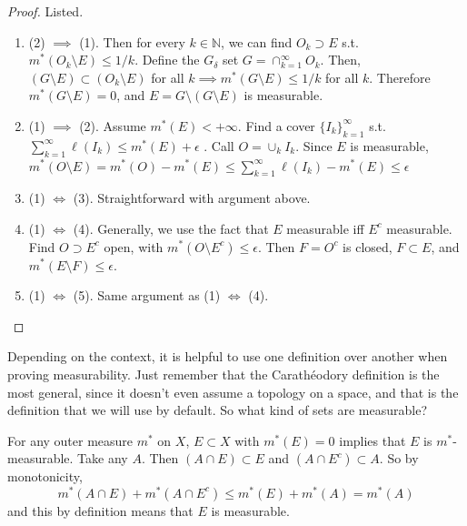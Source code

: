   \begin{proof}
    Listed. 
    \begin{enumerate}
      \item (2) $\implies$ (1). Then for every $k \in \mathbb{N}$, we can find $O_k \supset E$ s.t. $m^\ast (O_k \setminus E) \leq 1/k$. Define the $G_\delta$ set $G = \cap_{k=1}^\infty O_k$. Then, $(G \setminus E) \subset (O_k \setminus E)$ for all $k \implies m^\ast (G \setminus E) \leq 1/k$ for all $k$. Therefore $m^\ast (G \setminus E) = 0$, and $E = G \setminus (G \setminus E)$ is measurable. 

      \item (1) $\implies$ (2). Assume $m^\ast (E) < +\infty$. Find a cover $\{I_k \}_{k=1}^\infty$ s.t. $\sum_{k=1}^\infty \ell (I_k) \leq m^\ast (E) + \epsilon$ . Call $O = \cup_k I_k$. Since $E$ is measurable, $m^\ast (O \setminus E) = m^\ast (O) - m^\ast (E) \leq \sum_{k=1}^\infty \ell(I_k) - m^\ast (E) \leq \epsilon$ 

      \item (1) $\iff$ (3). Straightforward with argument above.  

      \item (1) $\iff$ (4). Generally, we use the fact that $E$ measurable iff $E^c$ measurable. Find $O \supset E^c$ open, with $m^\ast (O \setminus E^c) \leq \epsilon$. Then $F = O^c$ is closed, $F \subset E$, and $m^\ast (E \setminus F) \leq \epsilon$. 

      \item (1) $\iff$ (5). Same argument as (1) $\iff$ (4). 
    \end{enumerate}
  \end{proof}

  Depending on the context, it is helpful to use one definition over another when proving measurability. Just remember that the Carathéodory definition is the most general, since it doesn't even assume a topology on a space, and that is the definition that we will use by default. So what kind of sets are measurable? 

  \begin{example}
    For any outer measure $m^\ast$ on $X$, $E \subset X$ with $m^\ast (E) = 0$  implies that $E$ is $m^\ast$-measurable. Take any $A$. Then $(A \cap E) \subset E$ and $(A \cap E^c) \subset A$. So by monotonicity, 
    \begin{equation}
      m^\ast(A \cap E) + m^\ast (A \cap E^c) \leq m^\ast(E) + m^\ast(A) = m^\ast (A)
    \end{equation}
    and this by definition means that $E$ is measurable. 
  \end{example}

